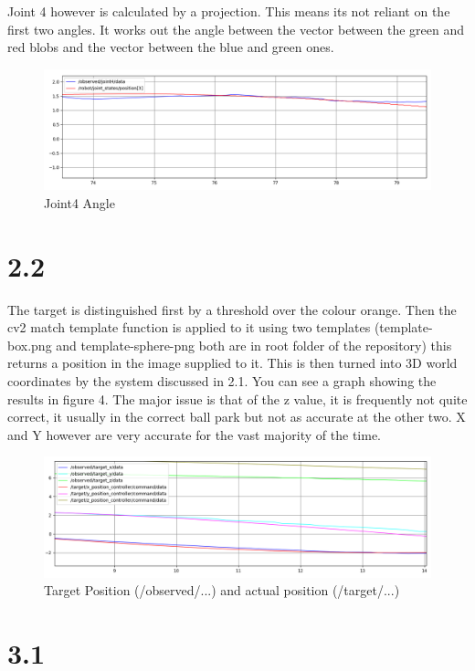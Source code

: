 \documentclass{report}
\begin{document}
Joint 4 however is calculated by a projection. This means its not reliant on the first two angles. It works out the angle between the vector between the
green and red blobs and the vector between the blue and green ones.

\begin{figure}
    \includegraphics[width=\linewidth]{joint4.png}
    \caption{Joint4 Angle}
\end{figure}

\section*{2.2}

The target is distinguished first by a threshold over the colour orange. Then the cv2 match template function is applied to it using two templates
(template-box.png and template-sphere-png both are in root folder of the repository) this returns a position in the image supplied to it. This is then
turned into 3D world coordinates by the system discussed in 2.1. You can see a graph showing the results in figure 4. The major issue is that of the z value, it is 
frequently not quite correct, it usually in the correct ball park but not as accurate at the other two. X and Y however are very accurate for the vast majority of the time.

\begin{figure}
    \includegraphics[width=\linewidth]{target.png}
    \caption{Target Position (/observed/...) and actual position (/target/...)}
\end{figure}

\section*{3.1}
\end{document}
